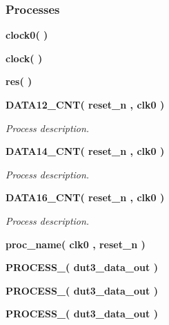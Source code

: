 \subsubsection*{Processes}
 \begin{DoxyCompactItemize}
\item 
{\bf clock0}{\bfseries  (  )}
\item 
{\bf clock}{\bfseries  (  )}
\item 
{\bf res}{\bfseries  (  )}
\item 
{\bf D\+A\+T\+A12\+\_\+\+C\+NT}{\bfseries  ( {\bfseries {\bfseries {\bf reset\+\_\+n}} \textcolor{vhdlchar}{ }} , {\bfseries {\bfseries {\bf clk0}} \textcolor{vhdlchar}{ }} )}
\begin{DoxyCompactList}\small\item\em Process description. \end{DoxyCompactList}\item 
{\bf D\+A\+T\+A14\+\_\+\+C\+NT}{\bfseries  ( {\bfseries {\bfseries {\bf reset\+\_\+n}} \textcolor{vhdlchar}{ }} , {\bfseries {\bfseries {\bf clk0}} \textcolor{vhdlchar}{ }} )}
\begin{DoxyCompactList}\small\item\em Process description. \end{DoxyCompactList}\item 
{\bf D\+A\+T\+A16\+\_\+\+C\+NT}{\bfseries  ( {\bfseries {\bfseries {\bf reset\+\_\+n}} \textcolor{vhdlchar}{ }} , {\bfseries {\bfseries {\bf clk0}} \textcolor{vhdlchar}{ }} )}
\begin{DoxyCompactList}\small\item\em Process description. \end{DoxyCompactList}\item 
{\bf proc\+\_\+name}{\bfseries  ( {\bfseries {\bfseries {\bf clk0}} \textcolor{vhdlchar}{ }} , {\bfseries {\bfseries {\bf reset\+\_\+n}} \textcolor{vhdlchar}{ }} )}
\item 
{\bf P\+R\+O\+C\+E\+S\+S\+\_}{\bfseries  ( {\bfseries {\bfseries {\bf dut3\+\_\+data\+\_\+out}} \textcolor{vhdlchar}{ }} )}
\item 
{\bf P\+R\+O\+C\+E\+S\+S\+\_}{\bfseries  ( {\bfseries {\bfseries {\bf dut3\+\_\+data\+\_\+out}} \textcolor{vhdlchar}{ }} )}
\item 
{\bf P\+R\+O\+C\+E\+S\+S\+\_}{\bfseries  ( {\bfseries {\bfseries {\bf dut3\+\_\+data\+\_\+out}} \textcolor{vhdlchar}{ }} )}
\end{DoxyCompactItemize}
